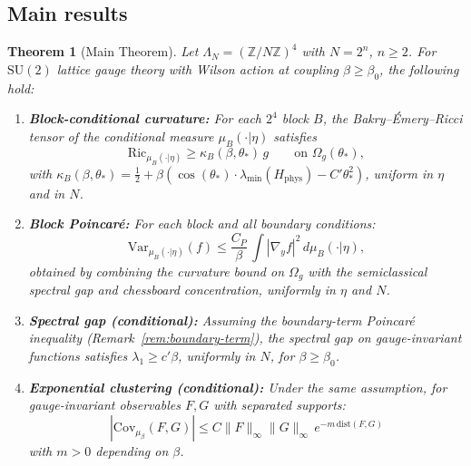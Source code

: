 \documentclass[11pt,a4paper]{article}
\theoremstyle{plain}
\newtheorem{theorem}{Theorem}[section]
\theoremstyle{definition}
\theoremstyle{remark}
\newcommand{\Z}{\mathbb{Z}}
\newcommand{\SU}{\mathrm{SU}}
\newcommand{\Ric}{\mathrm{Ric}}
\newcommand{\Var}{\mathrm{Var}}
\newcommand{\Cov}{\mathrm{Cov}}
\newcommand{\norm}[1]{\|#1\|}
\newcommand{\abs}[1]{|#1|}
\begin{document}
\subsection{Main results}

\begin{theorem}[Main Theorem]\label{thm:main}
Let $\Lambda_N = (\Z/N\Z)^4$ with $N = 2^n$, $n \geq 2$. For
$\SU(2)$ lattice gauge theory with Wilson action at coupling
$\beta \geq \beta_0$, the following hold:
\begin{enumerate}[label=(\roman*)]
\item \textbf{Block-conditional curvature:} For each
  $2^4$ block $B$, the Bakry--\'Emery--Ricci tensor of the
  conditional measure $\mu_B(\cdot|\eta)$ satisfies
  \begin{equation}
  \Ric_{\mu_B(\cdot|\eta)} \geq \kappa_B(\beta,\theta_*)\,g
  \qquad \text{on } \Omega_g(\theta_*),
  \end{equation}
  with $\kappa_B(\beta,\theta_*) = \frac{1}{2}
  + \beta(\cos(\theta_*)\cdot\lambda_{\min}(H_{\mathrm{phys}})
  - C'\theta_*^2)$,
  uniform in $\eta$ and in $N$.

\item \textbf{Block Poincar\'e:} For each block and all
  boundary conditions:
  \begin{equation}
  \Var_{\mu_B(\cdot|\eta)}(f) \leq \frac{C_P}{\beta}\,
  \int |\nabla_y f|^2\,d\mu_B(\cdot|\eta),
  \end{equation}
  obtained by combining the curvature bound on $\Omega_g$ with
  the semiclassical spectral gap and chessboard concentration,
  uniformly in $\eta$ and $N$.

\item \textbf{Spectral gap (conditional):} Assuming the boundary-term
  Poincar\'e inequality (Remark~\ref{rem:boundary-term}), the spectral
  gap on gauge-invariant functions satisfies $\lambda_1 \geq c'\beta$,
  uniformly in $N$, for $\beta \geq \beta_0$.

\item \textbf{Exponential clustering (conditional):} Under the same
  assumption, for gauge-invariant observables $F, G$ with separated
  supports:
  \begin{equation}
  \abs{\Cov_{\mu_\beta}(F,G)} \leq C\norm{F}_\infty\norm{G}_\infty\,
  e^{-m\,\mathrm{dist}(F,G)}
  \end{equation}
  with $m > 0$ depending on $\beta$.
\end{enumerate}
\end{theorem}
\end{document}
